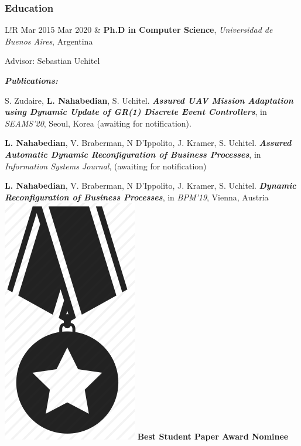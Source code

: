 \documentclass[10pt]{article}
\newcommand\VRule{\color{lightgray}\vrule width 0.5pt}
\begin{document}

\vspace{-0.5cm}
\subsubsection*{Education}

\begin{tabular}{L!{\VRule}R}
	Mar 2015 Mar 2020 & \textbf{Ph.D in Computer Science}, 
	\textit{Universidad de Buenos Aires}, Argentina
	
	Advisor: Sebastian Uchitel
	
	\textit{\textbf{Publications:}}
	\begin{compactitem}
	\item S. Zudaire, \textbf{L. Nahabedian}, S. Uchitel.
	\textbf{\textit{Assured UAV Mission Adaptation using Dynamic Update
	of GR(1) Discrete Event Controllers}}, in \textit{SEAMS'20}, Seoul, Korea 
	(awaiting for notification). 
	\item \textbf{L. Nahabedian}, V. Braberman, N D'Ippolito, J. Kramer, S. 
	Uchitel.
	\textbf{\textit{Assured Automatic Dynamic Reconfiguration of Business 
	Processes}}, in 
	\textit{Information Systems Journal}, (awaiting for notification)
	\item \textbf{L. Nahabedian}, V. Braberman, N D'Ippolito, J. Kramer, S. 
	Uchitel.
	\textbf{\textit{Dynamic Reconfiguration of Business Processes}}, in 
	\textit{BPM'19}, Vienna, Austria 
	\includegraphics[scale=0.022]{../img/medal.png}
	\textbf{Best Student Paper Award Nominee}

\end{compactitem}
\end{tabular}
\end{document}
